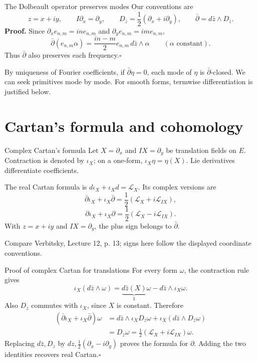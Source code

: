 \documentclass[aspectratio=169,11pt]{beamer}
\newcommand{\db}{\bar\partial}
\newcommand{\Lie}{\mathcal L}
\newcommand{\ee}{e_{n,m}}
\newcommand{\Dbar}{D_{\bar z}}
\newcommand{\src}[1]{\par\vfill{\scriptsize #1\par}}
\begin{document}
\begin{frame}{The Dolbeault operator preserves modes}
Our conventions are
\[
 z=x+iy,\qquad I\partial_x=\partial_y,\qquad
 \Dbar=\frac12(\partial_x+i\partial_y),\qquad
 \db=d\bar z\wedge\Dbar.
\]
\textbf{Proof.} Since $\partial_x\ee=in\ee$ and
$\partial_y\ee=im\ee$,
\[
 \db(\ee\alpha)=\frac{in-m}{2}\ee\,d\bar z\wedge\alpha
 \qquad(\alpha\text{ constant}).
\]
Thus $\db$ also preserves each frequency.\hfill$\square$

By uniqueness of Fourier coefficients, if $\db\eta=0$,
each mode of $\eta$ is $\db$-closed. We can seek primitives mode by mode.
For smooth forms, termwise differentiation is justified below.
\end{frame}

\section{Cartan's formula and cohomology}
\begin{frame}{Complex Cartan's formula}
Let $X=\partial_x$ and $IX=\partial_y$ be translation fields on $E$.
Contraction is denoted by $\iota_X$; on a one-form,
$\iota_X\eta=\eta(X)$. Lie derivatives differentiate coefficients.

The real Cartan formula is $d\iota_X+\iota_Xd=\Lie_X$.
Its complex versions are
\[
 \db\iota_X+\iota_X\db
 =\frac12(\Lie_X+i\Lie_{IX}),
\]
\[
 \partial\iota_X+\iota_X\partial
 =\frac12(\Lie_X-i\Lie_{IX}).
\]
With $z=x+iy$ and $IX=\partial_y$, the plus sign belongs to $\db$.
\src{Compare Verbitsky, Lecture 12, p. 13; signs here follow the displayed coordinate conventions.}
\end{frame}

\begin{frame}{Proof of complex Cartan for translations}
For every form $\omega$, the contraction rule gives
\[
 \iota_X(d\bar z\wedge\omega)
 =\underbrace{d\bar z(X)}_{1}\omega-d\bar z\wedge\iota_X\omega.
\]
Also $\Dbar$ commutes with $\iota_X$, since $X$ is constant. Therefore
\begin{align*}
 (\db\iota_X+\iota_X\db)\omega
 &=d\bar z\wedge\iota_X\Dbar\omega
   +\iota_X(d\bar z\wedge\Dbar\omega)\\
 &=\Dbar\omega
 =\tfrac12(\Lie_X+i\Lie_{IX})\omega.
\end{align*}
Replacing $d\bar z,\Dbar$ by $dz,\tfrac12(\partial_x-i\partial_y)$
proves the formula for $\partial$.
Adding the two identities recovers real Cartan.\hfill$\square$
\end{frame}
\end{document}

